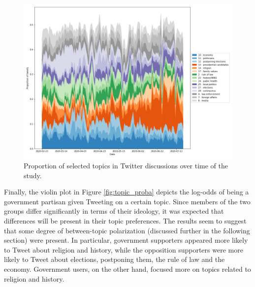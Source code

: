 \documentclass{article}
\begin{document}
	\begin{figure}[!h]
		\includegraphics[width=1.1\columnwidth]{figures/temp_dist.png}
		\caption{Proportion of selected topics in Twitter discussions over time of the study.}
		\label{fig:topics_time}
	\end{figure}

	Finally, the violin plot in Figure \ref{fig:topic_proba} depicts the log-odds of being a government partisan given Tweeting on a certain topic. Since members of the two groups differ significantly in terms of their ideology, it was expected that differences will be present in their topic preferences. The results seem to suggest that some degree of between-topic polarization (discussed further in the following section) were present. In particular, government supporters appeared more likely to Tweet about religion and history, while the opposition supporters were more likely to Tweet about elections, postponing them, the rule of law and the economy. Government users, on the other hand, focused more on topics related to religion and history.
	
\end{document}
